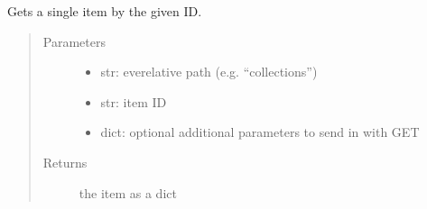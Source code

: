\documentclass[letterpaper,10pt,english]{sphinxmanual}
\begin{document}
\begin{fulllineitems}
\label{\detokenize{autoapi/pine/backend/data/service/index:pine.backend.data.service.get_item_by_id}}
Gets a single item by the given ID.
\begin{quote}\begin{description}
\item[{Parameters}] \leavevmode\begin{itemize}
\item {} 
 \textendash{} str: eve\sphinxhyphen{}relative path (e.g. “collections”)

\item {} 
 \textendash{} str: item ID

\item {} 
 \textendash{} dict: optional additional parameters to send in with GET

\end{itemize}

\item[{Returns}] \leavevmode
the item as a dict

\end{description}\end{quote}

\end{fulllineitems}


\begin{fulllineitems}
\label{\detokenize{autoapi/pine/backend/data/service/index:pine.backend.data.service.get_all_versions_of_item_by_id}}
\end{fulllineitems}

\end{document}
